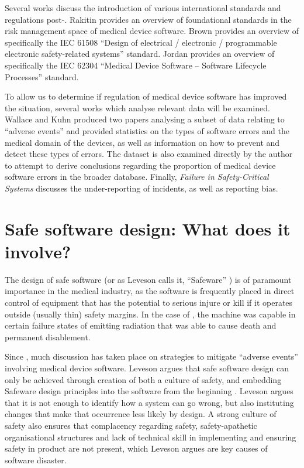 \documentclass{cshonours}
\begin{document}
Several works discuss the introduction of various international standards and regulations post-\ther. Rakitin \cite{rakitin2006coping} provides an overview of foundational standards in the risk management space of medical device software. Brown \cite{brown2000overview} provides an overview of specifically the IEC 61508 ``Design of electrical / electronic / programmable electronic safety-related systems'' standard. Jordan \cite{jordan2006standard} provides an overview of specifically the IEC 62304 ``Medical Device Software -- Software Lifecycle Processes'' standard.

To allow us to determine if regulation of medical device software has improved the situation, several works which analyse relevant data will be examined. Wallace and Kuhn produced two papers \cite{wallace1999lessons,wallace2001failure} analysing a subset of \fda data relating to ``adverse events'' and provided statistics on the types of software errors and the medical domain of the devices, as well as information on how to prevent and detect these types of errors. The \fda \maude dataset \cite{maude} is also examined directly by the author to attempt to derive conclusions regarding the proportion of medical device software errors in the broader \maude database. Finally, \textit{Failure in Safety-Critical Systems} \cite[ch.~5]{johnson2003failure} discusses the under-reporting of incidents, as well as reporting bias.

\chapter{Safe software design: What does it involve?}
\label{chap:safesoftware}
The design of safe software (or as Leveson calls it, ``Safeware'' \cite{safeware}) is of paramount importance in the medical industry, as the software is frequently placed in direct control of equipment that has the potential to serious injure or kill if it operates outside (usually thin) safety margins. In the case of \ther, the machine was capable in certain failure states of emitting radiation that was able to cause death and permanent disablement.

Since \ther, much discussion has taken place on strategies to mitigate ``adverse events'' involving medical device software. Leveson argues that safe software design can only be achieved through creation of both a culture of safety, \cite[ch.~4]{safeware} and embedding Safeware design principles into the software from the beginning \cite[ch.~16]{safeware}. Leveson argues that it is not enough to identify how a system can go wrong, but also instituting changes that make that occurrence less likely by design. A strong culture of safety also ensures that complacency regarding safety, safety-apathetic organisational structures and lack of technical skill in implementing and ensuring safety in product are not present, which Leveson argues are key causes of software disaster.
\end{document}
